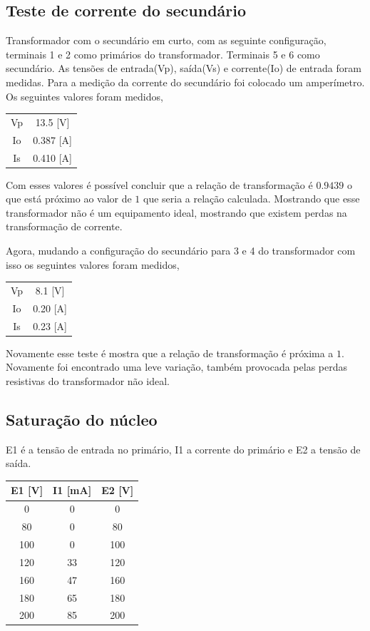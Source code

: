 \documentclass[conference]{IEEEtran}
\begin{document}
\subsection{Teste de corrente do secundário}
Transformador com o secundário em curto, com as seguinte configuração, terminais 1 e 2 como primários do transformador. Terminais 5 e 6 como secundário.
As tensões de entrada(Vp), saída(Vs) e corrente(Io) de entrada foram medidas.
Para a medição da corrente do secundário foi colocado um amperímetro.
Os seguintes valores foram medidos,

\begin{center}
    \begin{tabular}{|c||c|}
        \hline
        Vp & 13.5 [V] \\
        Io & 0.387 [A] \\
        Is & 0.410 [A] \\
        \hline
    \end{tabular}
\end{center}

Com esses valores é possível concluir que a relação de transformação é $0.9439$ o que
está próximo ao valor de $1$ que seria a relação calculada. Mostrando que
esse transformador não é um equipamento ideal, mostrando que existem perdas na
transformação de corrente.

Agora, mudando a configuração do secundário para 3 e 4 do transformador
com isso os seguintes valores foram medidos,
\begin{center}
    \begin{tabular}{|c||c|}
        \hline
        Vp & 8.1 [V] \\
        Io & 0.20 [A] \\
        Is & 0.23 [A] \\
        \hline
    \end{tabular}
\end{center}

Novamente esse teste é mostra que a relação de transformação é próxima
a $1$. Novamente foi encontrado uma leve variação, também provocada pelas
perdas resistivas do transformador não ideal.

\subsection{Saturação do núcleo}
E1 é a tensão de entrada no primário, I1 a corrente do primário e E2 a 
tensão de saída.
\begin{center}
    \begin{tabular}{|c||c||c|}
        \hline
        E1 [V] & I1 [mA] & E2 [V] \\
        \hline
        0 & 0 & 0 \\
        80 & 0 & 80 \\
        100 & 0 & 100 \\
        120 & 33 & 120 \\
        160 & 47 & 160 \\
        180 & 65 & 180 \\
        200 & 85 & 200 \\
        \hline
    \end{tabular}
\end{center}
\end{document}
